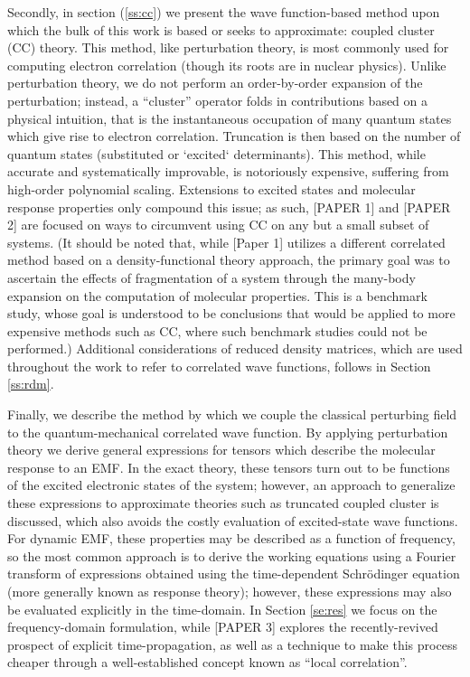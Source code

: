Secondly, in section (\ref{ss:cc}) we present the wave function-based method upon which the bulk 
of this work is based or seeks to approximate: coupled cluster (CC) theory. 
This method, like perturbation theory, is most commonly used for computing electron correlation 
(though its roots are in nuclear physics). 
Unlike perturbation theory, we do not perform an order-by-order expansion of the perturbation; 
instead, a ``cluster'' operator folds in contributions based on a physical intuition, that is the 
instantaneous occupation of many quantum states which give rise to electron correlation. Truncation
is then based on the number of quantum states (substituted or `excited` determinants). This method,
while accurate and systematically improvable, is notoriously expensive, suffering from high-order
polynomial scaling. Extensions to excited states and molecular response properties only compound this 
issue; as such, [PAPER 1] and [PAPER 2] are focused on ways to circumvent using CC on any but a small 
subset of systems. (It should be noted that, while [Paper 1] utilizes a different correlated method 
based on a density-functional theory approach, the primary goal was to ascertain the effects of 
fragmentation of a system through the many-body expansion on the computation of molecular properties. 
This is a benchmark study, whose goal is understood to be conclusions that would be applied to more 
expensive methods such as CC, where such benchmark studies could not be performed.)
Additional considerations of reduced density matrices, which are used throughout the work to refer
to correlated wave functions, follows in Section \ref{ss:rdm}.

Finally, we describe the method by which we couple the classical perturbing field to the 
quantum-mechanical correlated wave function. 
By applying perturbation theory we derive general expressions for tensors which describe 
the molecular response to an EMF. In the exact theory, these tensors turn out to be functions of the 
excited electronic states of the system; however, an approach to generalize 
these expressions to approximate theories such as truncated coupled cluster is discussed, which also 
avoids the costly evaluation of excited-state wave functions. For dynamic EMF, these properties may be 
described as a function of frequency, so the most common approach is to derive the working equations
using a Fourier transform of expressions obtained using the time-dependent Schr\"odinger equation 
(more generally known as response theory); however, these expressions may also be evaluated explicitly
in the time-domain. In Section \ref{se:res} we focus on the frequency-domain formulation, while
[PAPER 3] explores the recently-revived prospect of explicit time-propagation, as well as a 
technique to make this process cheaper through a well-established concept known as 
``local correlation''. 
